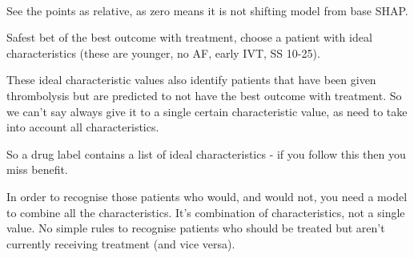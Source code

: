 \begin{figure}
\\
\caption{}
\label{fig:shap_violin_none_benefit_ivt}
\end{figure}

See the points as relative, as zero means it is not shifting model from base SHAP.

Safest bet of the best outcome with treatment, choose a patient with ideal characteristics (these are younger, no AF, early IVT, SS 10-25).

These ideal characteristic values also identify patients that have been given thrombolysis but are predicted to not have the best outcome with treatment. So we can't say always give it to a single certain characteristic value, as need to take into account all characteristics.

So a drug label contains a list of ideal characteristics - if you follow this then you miss benefit. 

In order to recognise those patients who would, and would not, you need a model to combine all the characteristics. It's combination of characteristics, not a single value. No simple rules to recognise patients who should be treated but aren't currently receiving treatment (and vice versa).

